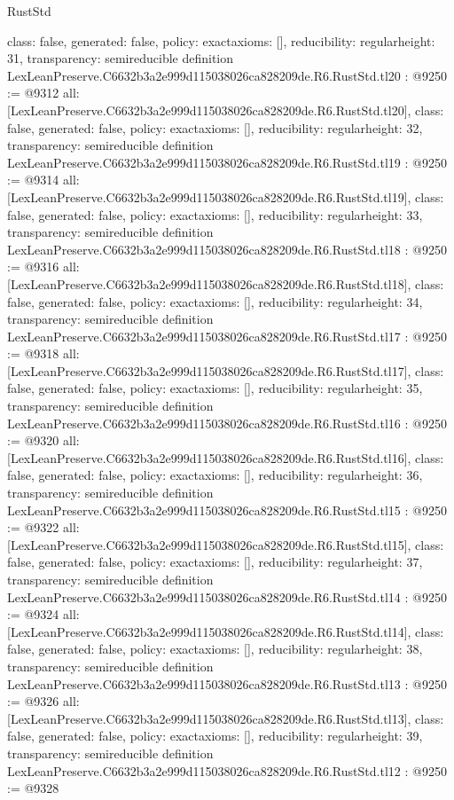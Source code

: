 \begin{lexlean}{RustStd}
\begin{coremodule}
{  class: false,
  generated: false,
  policy: exact{axioms: []},
  reducibility: regular{height: 31},
  transparency: semireducible
}
definition LexLeanPreserve.C6632b3a2e999d115038026ca828209de.R6.RustStd.tl20 : @9250 := @9312 {
  all: [LexLeanPreserve.C6632b3a2e999d115038026ca828209de.R6.RustStd.tl20],
  class: false,
  generated: false,
  policy: exact{axioms: []},
  reducibility: regular{height: 32},
  transparency: semireducible
}
definition LexLeanPreserve.C6632b3a2e999d115038026ca828209de.R6.RustStd.tl19 : @9250 := @9314 {
  all: [LexLeanPreserve.C6632b3a2e999d115038026ca828209de.R6.RustStd.tl19],
  class: false,
  generated: false,
  policy: exact{axioms: []},
  reducibility: regular{height: 33},
  transparency: semireducible
}
definition LexLeanPreserve.C6632b3a2e999d115038026ca828209de.R6.RustStd.tl18 : @9250 := @9316 {
  all: [LexLeanPreserve.C6632b3a2e999d115038026ca828209de.R6.RustStd.tl18],
  class: false,
  generated: false,
  policy: exact{axioms: []},
  reducibility: regular{height: 34},
  transparency: semireducible
}
definition LexLeanPreserve.C6632b3a2e999d115038026ca828209de.R6.RustStd.tl17 : @9250 := @9318 {
  all: [LexLeanPreserve.C6632b3a2e999d115038026ca828209de.R6.RustStd.tl17],
  class: false,
  generated: false,
  policy: exact{axioms: []},
  reducibility: regular{height: 35},
  transparency: semireducible
}
definition LexLeanPreserve.C6632b3a2e999d115038026ca828209de.R6.RustStd.tl16 : @9250 := @9320 {
  all: [LexLeanPreserve.C6632b3a2e999d115038026ca828209de.R6.RustStd.tl16],
  class: false,
  generated: false,
  policy: exact{axioms: []},
  reducibility: regular{height: 36},
  transparency: semireducible
}
definition LexLeanPreserve.C6632b3a2e999d115038026ca828209de.R6.RustStd.tl15 : @9250 := @9322 {
  all: [LexLeanPreserve.C6632b3a2e999d115038026ca828209de.R6.RustStd.tl15],
  class: false,
  generated: false,
  policy: exact{axioms: []},
  reducibility: regular{height: 37},
  transparency: semireducible
}
definition LexLeanPreserve.C6632b3a2e999d115038026ca828209de.R6.RustStd.tl14 : @9250 := @9324 {
  all: [LexLeanPreserve.C6632b3a2e999d115038026ca828209de.R6.RustStd.tl14],
  class: false,
  generated: false,
  policy: exact{axioms: []},
  reducibility: regular{height: 38},
  transparency: semireducible
}
definition LexLeanPreserve.C6632b3a2e999d115038026ca828209de.R6.RustStd.tl13 : @9250 := @9326 {
  all: [LexLeanPreserve.C6632b3a2e999d115038026ca828209de.R6.RustStd.tl13],
  class: false,
  generated: false,
  policy: exact{axioms: []},
  reducibility: regular{height: 39},
  transparency: semireducible
}
definition LexLeanPreserve.C6632b3a2e999d115038026ca828209de.R6.RustStd.tl12 : @9250 := @9328 {
}
\end{coremodule}
\end{lexlean}
